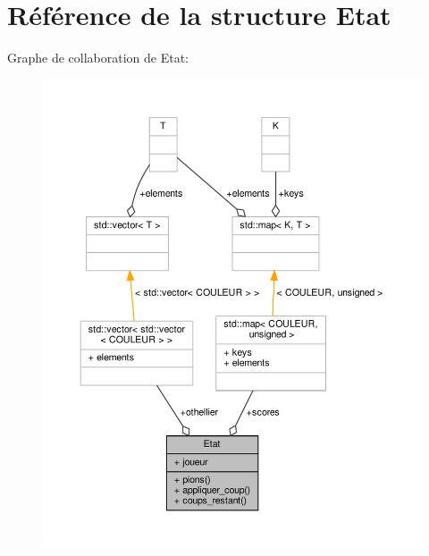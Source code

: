 \hypertarget{structEtat}{}\section{Référence de la structure Etat}
\label{structEtat}


Graphe de collaboration de Etat\+:\nopagebreak
\begin{figure}[H]
\begin{center}
\leavevmode
\includegraphics[width=350pt]{structEtat__coll__graph}
\end{center}
\end{figure}
